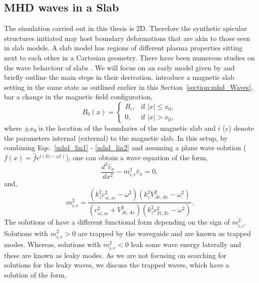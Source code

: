 \subsection{MHD waves in a Slab}
\label{section:Tan_I}
The simulation carried out in this thesis is 2D. Therefore the synthetic spicular structures initiated may host boundary deformations that are akin to those seen in slab models. A slab model has regions of different plasma properties sitting next to each other in a Cartesian geometry. There have been numerous studies on the wave behaviour of slabs \citep{Roberts1981SoPh6939R, Edwin1982SoPh76239E, Roberts1990IAUS142159R, Goossens1992SoPh138233G, Goossens2009AA503213G, Murawski2015AA577A126M, Allcock2017SoPh29235A, zsamberger2021ApJ906122Z}. We will focus on an early model given by \cite{Roberts1981SoPh6939R} and briefly outline the main steps in their derivation. \cite{Roberts1981SoPh6939R} introduce a magnetic slab setting in the same state as outlined earlier in this Section~\ref{section:mhd_Waves}, bar a change in the magnetic field configuration,
\begin{equation}
    B_0(x) = 
    \begin{cases}
      B_i, & \text{if } |x| \leq x_0, \\
      0, & \text{if } |x| > x_0,
    \end{cases}
\end{equation}
where $\pm x_0$ is the location of the boundaries of the magnetic slab and $i$ ($e$) denote the parameters internal (external) to the magnetic slab. In this setup, by combining Eqs.~\eqref{mhd_lin1} - \eqref{mhd_lin2} and assuming a plane wave solution ($f(x)=\hat{f} e^{i(kz-\omega t)}$), one can obtain a wave equation of the form,
\begin{equation}\label{eva_trapp}
    \frac{d^2 \hat{v}_x}{dx^2}-m^2_{i,e} \hat{v}_x = 0,
\end{equation}
and,
\begin{equation}
    m_{i,e}^2 = \frac{(k_z^2 c_{si,se}^2-\omega^2)(k_z^2 V_{Ai,Ae}^2-\omega^2)}{(c_{si,se}^2+V_{Ai,Ae}^2)(k_z^2 c_{Ti,Te}^2-\omega^2)}.
\end{equation}
The solutions of  have a different functional form depending on the sign of $m^2_{i,e}$. Solutions with $m^2_{i,e}>0$ are trapped by the waveguide and are known as trapped modes. Whereas, solutions with $m^2_{i,e}<0$ leak some wave energy laterally and these are known as leaky modes. As we are not focusing on searching for solutions for the leaky waves, we discuss the trapped waves, which have a solution of the form,

